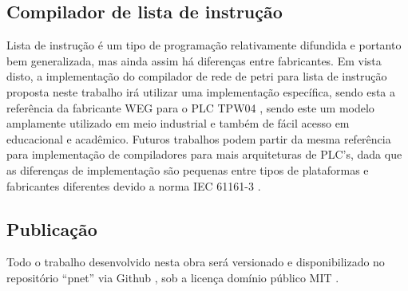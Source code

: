 \subsection{Compilador de lista de instrução}

Lista de instrução é um tipo de programação relativamente difundida e portanto bem generalizada, mas ainda assim há diferenças entre fabricantes. Em vista disto, a implementação do compilador de rede de petri para lista de instrução proposta neste trabalho irá utilizar uma implementação específica, sendo esta a referência da fabricante WEG para o PLC TPW04 \cite{wegtpw04}, sendo este um modelo amplamente utilizado em meio industrial e também de fácil acesso em educacional e acadêmico. Futuros trabalhos podem partir da mesma referência para implementação de compiladores para mais arquiteturas de PLC's, dada que as diferenças de implementação são pequenas entre tipos de plataformas e fabricantes diferentes devido a norma IEC 61161-3 \cite{IEC611313}.  

\subsection{Publicação}

Todo o trabalho desenvolvido nesta obra será versionado e disponibilizado no repositório ``pnet'' \cite{github-pnet} via Github \cite{github}, sob a licença domínio público MIT \cite{mit-license}.

